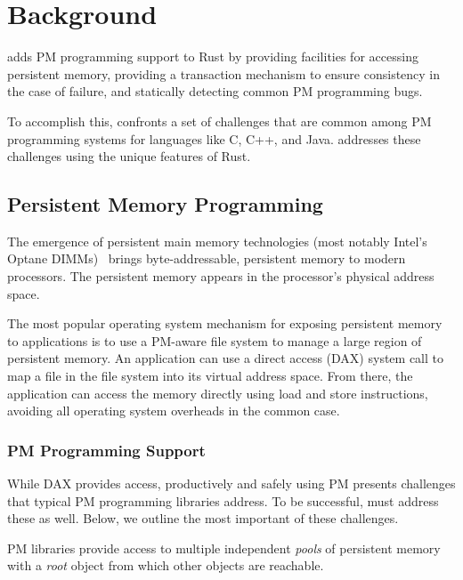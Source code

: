 \section{Background}
\label{sec:background}

\this{} adds PM programming support to Rust by providing facilities for
accessing persistent memory, providing a transaction mechanism to ensure
consistency in the case of failure, and statically detecting common PM
programming bugs.

To accomplish this, \this{}  confronts a set of challenges that are common
among PM programming systems for languages like C, C++, and Java.
\This{} addresses these challenges using the unique features of Rust.


\subsection{Persistent Memory Programming}
\label{sec:prog}

The emergence of persistent main memory technologies (most notably Intel's
Optane DIMMs)~\cite{3DXPoint} brings byte-addressable, persistent memory to
modern processors.  The persistent memory appears in the processor's physical
address space.

The most popular operating system mechanism for exposing persistent memory to
applications is to use a PM-aware file system to manage a large region of
persistent memory.  An application can use a direct access (DAX) \mmap{} system
call to map a file in the file system into its virtual address space.  From
there, the application can access the memory directly using load and store
instructions, avoiding all operating system overheads in the common case.

\subsubsection{PM Programming Support}

While DAX \mmap{} provides access, productively and safely using PM presents
challenges that typical PM programming libraries address.  To be
successful, \this{} must address these as well.  Below, we outline the most
important of these challenges.
  

PM libraries provide access to
multiple independent \emph{pools} of persistent memory with a \emph{root} object
from which other objects are reachable.

